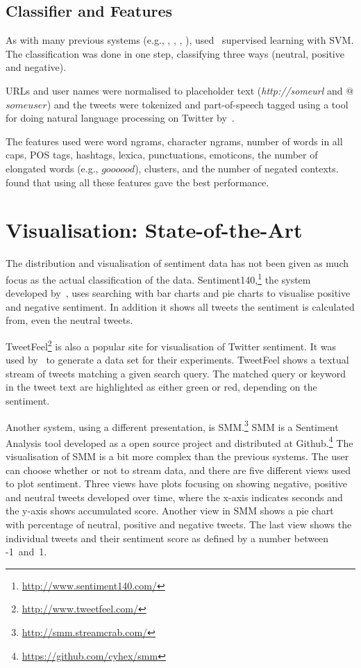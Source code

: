 \subsection{Classifier and Features}
As with many previous systems (e.g., \cite{article:bermingham}, \cite{chamlertwat2012discovering}, \cite{zhang2011combining}, \cite{asiaee2012if}), used~\cite{MohammadEA:13} supervised learning with SVM. The classification was done in one step, classifying three ways (neutral, positive and negative).

URLs and user names were normalised to placeholder text (\textit{http://someurl} and  $@$$someuser$) and the tweets were tokenized and part-of-speech tagged using a tool for doing natural language processing on Twitter by~\cite{gimpel2010part}. 

The features used were word ngrams, character ngrams, number of words in all caps, POS tags, hashtags, lexica, punctuations, emoticons, the number of elongated words (e.g., $goooood$), clusters, and the number of negated contexts. \cite{MohammadEA:13} found that using all these features gave the best performance.

\section{Visualisation: State-of-the-Art}\label{sec:visualisation_state}
The distribution and visualisation of sentiment data has not been given as much focus as the actual classification of the data. Sentiment140,\footnote{\url{http://www.sentiment140.com/}} the system developed by~\cite{article:go}, uses searching with bar charts and pie charts to visualise positive and negative sentiment. In addition it shows all tweets the sentiment is calculated from, even the neutral tweets.

TweetFeel\footnote{\url{http://www.tweetfeel.com/}} is also a popular site for visualisation of Twitter sentiment. It was used by~\cite{barbosa2010robust} to generate a data set for their experiments. TweetFeel shows a textual stream of tweets matching a given search query. The matched query or keyword in the tweet text are highlighted as either green or red, depending on the sentiment.

Another system, using a different presentation, is SMM.\footnote{\url{http://smm.streamcrab.com/}} SMM is a Sentiment Analysis tool developed as a open source project and distributed at Github.\footnote{\url{https://github.com/cyhex/smm}} The visualisation of SMM is a bit more complex than the previous systems. The user can choose whether or not to stream data, and there are five different views used to plot sentiment. Three views have plots focusing on showing negative, positive and neutral tweets developed over time, where the x-axis indicates seconds and the y-axis shows accumulated score. Another view in SMM shows a pie chart with percentage of neutral, positive and negative tweets. The last view shows the individual tweets and their sentiment score as defined by a number between -1~and~1.

